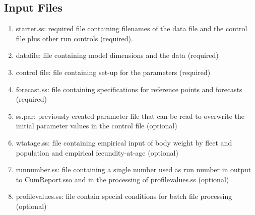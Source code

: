 	\subsection{Input Files}
	\begin{enumerate}
		\item starter.ss: required file containing filenames of the data file and the control file plus other run controls (required).
		\item datafile: file containing model dimensions and the data (required)
		\item control file: file containing set-up for the parameters (required)
		\item forecast.ss: file containing specifications for reference points and forecasts (required) 
		\item ss.par: previously created parameter file that can be read to overwrite the initial parameter values in the control file (optional)
		\item wtatage.ss: file containing empirical input of body weight by fleet and population and empirical fecundity-at-age (optional)
		\item runnumber.ss: file containing a single number used as run number in output to CumReport.sso and in the processing of profilevalues.ss (optional)
		\item profilevalues.ss: file contain special conditions for batch file processing (optional)
	\end{enumerate}
	
